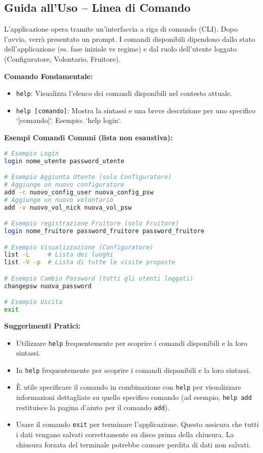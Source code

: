 \documentclass[a4paper,12pt]{article}
\begin{document}
\subsection{Guida all'Uso -- Linea di Comando}
L'applicazione opera tramite un'interfaccia a riga di comando (CLI). Dopo l'avvio, verrà presentato un prompt. I comandi disponibili dipendono dallo stato dell'applicazione (es. fase iniziale vs regime) e dal ruolo dell'utente loggato (Configuratore, Volontario, Fruitore).

\textbf{Comando Fondamentale:}
\begin{itemize}
    \item \texttt{help}: Visualizza l'elenco dei comandi disponibili nel contesto attuale.
    \item \texttt{help [comando]}: Mostra la sintassi e una breve descrizione per uno specifico `[comando]`. Esempio: `help login`.
\end{itemize}

\textbf{Esempi Comandi Comuni (lista non esaustiva):}
\begin{lstlisting}[language=bash, numbers=none, frame=lines, rulecolor=\color{lightgray}]
# Esempio Login
login nome_utente password_utente

# Esempio Aggiunta Utente (solo Configuratore)
# Aggiunge un nuovo configuratore
add -c nuovo_config_user nuova_config_psw
# Aggiunge un nuovo volontario
add -v nuovo_vol_nick nuova_vol_psw

# Esempio registrazione Fruitore (solo Fruitore)
login nome_fruitore password_fruitore password_fruitore

# Esempio Visualizzazione (Configuratore)
list -L     # Lista dei luoghi
list -V -p  # Lista di tutte le visite proposte

# Esempio Cambio Password (tutti gli utenti loggati)
changepsw nuova_password

# Esempio Uscita
exit

\end{lstlisting}

\textbf{\newline Suggerimenti Pratici:}
\begin{itemize}
    \item Utilizzare \texttt{help} frequentemente per scoprire i comandi disponibili e la loro sintassi.
    \item In \texttt{help} frequentemente per scoprire i comandi disponibili e la loro sintassi.
    \item È utile specificare il comando in combinazione con \texttt{help} per visualizzare informazioni dettagliate su quello specifico comando (ad esempio, \texttt{help add} restituisce la pagina d'aiuto per il comando \texttt{add}).
    \item Usare il comando \texttt{exit} per terminare l'applicazione. Questo assicura che tutti i dati vengano salvati correttamente su disco prima della chiusura. La chiusura forzata del terminale potrebbe causare perdita di dati non salvati.
\end{itemize}
\end{document}
